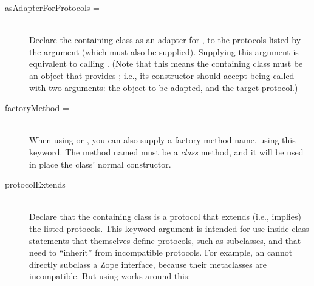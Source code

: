 \begin{verbatim%
}
\begin{verbatim%
}
\begin{verbatim%
}
\begin{verbatim%
}
\begin{verbatim%
}
\begin{verbatim%
}
\begin{description}
\item[asAdapterForProtocols = ] \hfill \\
Declare the containing class as an adapter for , to the
protocols listed by the  argument (which must also be
supplied).  Supplying this argument is equivalent to calling
.  (Note that this means the containing class must be
an object that provides ; i.e., its constructor should
accept being called with two arguments: the object to be adapted, and the
target protocol.)

\item[factoryMethod = ] \hfill \\ 
When using  or , you can
also supply a factory method name, using this keyword.  The method named must be
a \emph{class} method, and it will be used in place the class' normal constructor.

\item[protocolExtends = ] \hfill \\
Declare that the containing class is a protocol that extends (i.e., implies)
the listed protocols.  This keyword argument is intended for use inside class
statements that themselves define protocols, such as 
subclasses, and that need to ``inherit'' from incompatible protocols.  For
example, an  cannot directly subclass a Zope interface,
because their metaclasses are incompatible.  But using 
works around this:

\end{description}
\end{verbatim%
}
\end{verbatim%
}
\end{verbatim%
}
\end{verbatim%
}
\end{verbatim%
}
\end{verbatim%
}
